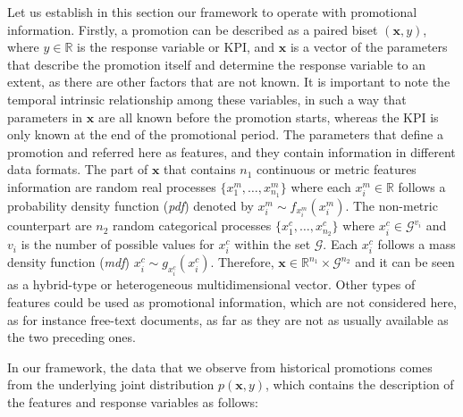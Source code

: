 \documentclass{ieeeaccess}
\begin{document}
Let us establish in this section our framework to operate with promotional information. Firstly, a promotion can be described as a paired biset $(\mathbf{x},y)$, where $y \in \mathbb{R}$ is the response variable or KPI, and $\mathbf{x}$ is a vector of the parameters that describe the promotion itself and determine the response variable to an extent, as there are other factors that are not known. It is important to note the temporal intrinsic relationship among these variables, in such a way that parameters in $\mathbf{x}$ are all known before the promotion starts, whereas the KPI is only known at the end of the promotional period. 
The parameters that define a promotion and referred here as features, and they contain information in %
different data formats.
The part of $\mathbf{x}$ that contains $n_1$ continuous or metric features  information are random real processes $\{x_1^m, \ldots , x_{n_1}^m \}$ where each $x_i^m \in \mathbb{R}$ follows a probability density function ({\it pdf}) denoted by $x_i^m \sim f_{x_i^m}(x_i^m)$. The %
non-metric counterpart are $n_2$ random categorical processes $\{x_1^c, \ldots , x_{n_2}^c \}$ where $x_i^c \in \mathcal{G}^{v_i}$ and $v_i$ is the number of possible values for $x_i^c$ within the set $\mathcal{G}$. Each $x_i^c$ follows a mass density function ({\it mdf}) $x_i^c \sim g_{x_i^c}(x_i^c)$. Therefore, $\mathbf{x} \in \mathbb{R}^{n_1} \times \mathcal{G}^{n_2}$ and it can be seen as a hybrid-type or heterogeneous multidimensional vector. Other types of features could be used as promotional information, which are not considered here, as for instance free-text documents, as far as they are not as usually available as the two preceding ones. 

In our framework, the data that we observe from historical promotions comes from the underlying joint distribution $p({\mathbf{x}}, y)$, which contains the description of the features and response variables as follows:

\end{document}
